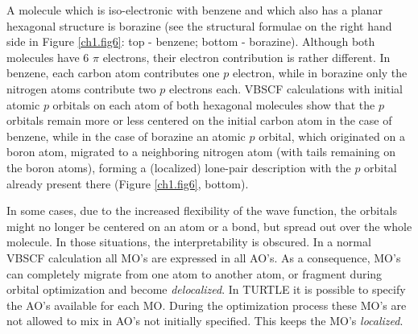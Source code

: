 A molecule which is iso-electronic with benzene and which also has a planar hexagonal structure is borazine (see the structural formulae on the right hand side in Figure \ref{ch1.fig6}: top - benzene; bottom - borazine). Although both molecules have 6 $\pi$ electrons, their electron contribution is rather different. In benzene, each carbon atom contributes one $p$ electron, while in borazine only the nitrogen atoms contribute two $p$ electrons each. VBSCF calculations with initial atomic $p$ orbitals on each atom of both hexagonal molecules show that the $p$ orbitals remain more or less centered on the initial carbon atom in the case of benzene,  while in the case of borazine an atomic $p$ orbital, which originated on a boron atom, migrated to a neighboring nitrogen atom (with tails remaining on the boron atoms), forming a (localized) lone-pair description with the $p$ orbital already present there (Figure \ref{ch1.fig6}, bottom).

In some cases, due to the increased flexibility of the wave function, the orbitals might no longer be centered on an atom or a bond, but spread out over the whole molecule. In those situations, the interpretability is obscured. In a normal VBSCF calculation all MO's are expressed in all AO's. As a consequence, MO's can completely migrate from one atom to another atom, or fragment during orbital optimization and become \textit{delocalized}. In TURTLE it is possible to specify the AO's available for each MO. During the optimization process these MO's are not allowed to mix in AO's not initially specified. This keeps the MO's \textit{localized}. 

